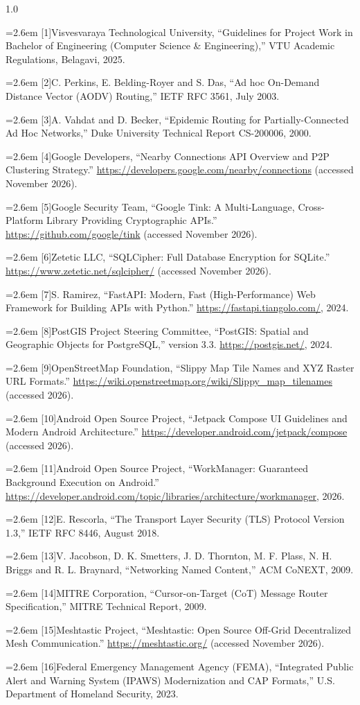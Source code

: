 \documentclass[12pt,a4paper]{report}
\newcommand{\refitem}[2]{\par\noindent\hangindent=2.6em\hangafter=1 [#1]\hspace{0.9em}#2\par\vspace{2pt}}
\begin{document}
\begin{spacing}{1.0}
\small
\refitem{1}{Visvesvaraya Technological University, ``Guidelines for Project Work in Bachelor of Engineering (Computer Science & Engineering),'' VTU Academic Regulations, Belagavi, 2025.}
\refitem{2}{C. Perkins, E. Belding-Royer and S. Das, ``Ad hoc On-Demand Distance Vector (AODV) Routing,'' IETF RFC 3561, July 2003.}
\refitem{3}{A. Vahdat and D. Becker, ``Epidemic Routing for Partially-Connected Ad Hoc Networks,'' Duke University Technical Report CS-200006, 2000.}
\refitem{4}{Google Developers, ``Nearby Connections API Overview and P2P Clustering Strategy.'' \url{https://developers.google.com/nearby/connections} (accessed November 2026).}
\refitem{5}{Google Security Team, ``Google Tink: A Multi-Language, Cross-Platform Library Providing Cryptographic APIs.'' \url{https://github.com/google/tink} (accessed November 2026).}
\refitem{6}{Zetetic LLC, ``SQLCipher: Full Database Encryption for SQLite.'' \url{https://www.zetetic.net/sqlcipher/} (accessed November 2026).}
\refitem{7}{S. Ramirez, ``FastAPI: Modern, Fast (High-Performance) Web Framework for Building APIs with Python.'' \url{https://fastapi.tiangolo.com/}, 2024.}
\refitem{8}{PostGIS Project Steering Committee, ``PostGIS: Spatial and Geographic Objects for PostgreSQL,'' version 3.3. \url{https://postgis.net/}, 2024.}
\refitem{9}{OpenStreetMap Foundation, ``Slippy Map Tile Names and XYZ Raster URL Formats.'' \url{https://wiki.openstreetmap.org/wiki/Slippy_map_tilenames} (accessed 2026).}
\refitem{10}{Android Open Source Project, ``Jetpack Compose UI Guidelines and Modern Android Architecture.'' \url{https://developer.android.com/jetpack/compose} (accessed 2026).}
\refitem{11}{Android Open Source Project, ``WorkManager: Guaranteed Background Execution on Android.'' \url{https://developer.android.com/topic/libraries/architecture/workmanager}, 2026.}
\refitem{12}{E. Rescorla, ``The Transport Layer Security (TLS) Protocol Version 1.3,'' IETF RFC 8446, August 2018.}
\refitem{13}{V. Jacobson, D. K. Smetters, J. D. Thornton, M. F. Plass, N. H. Briggs and R. L. Braynard, ``Networking Named Content,'' ACM CoNEXT, 2009.}
\refitem{14}{MITRE Corporation, ``Cursor-on-Target (CoT) Message Router Specification,'' MITRE Technical Report, 2009.}
\refitem{15}{Meshtastic Project, ``Meshtastic: Open Source Off-Grid Decentralized Mesh Communication.'' \url{https://meshtastic.org/} (accessed November 2026).}
\refitem{16}{Federal Emergency Management Agency (FEMA), ``Integrated Public Alert and Warning System (IPAWS) Modernization and CAP Formats,'' U.S. Department of Homeland Security, 2023.}

\end{spacing}
\end{document}
